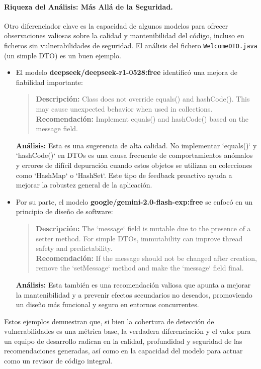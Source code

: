 \paragraph{Riqueza del Análisis: Más Allá de la Seguridad.}
Otro diferenciador clave es la capacidad de algunos modelos para ofrecer observaciones valiosas sobre la calidad y mantenibilidad del código, incluso en ficheros sin vulnerabilidades de seguridad. El análisis del fichero \texttt{WelcomeDTO.java} (un simple DTO) es un buen ejemplo.

\begin{itemize}
    \item El modelo \textbf{deepseek/deepseek-r1-0528:free} identificó una mejora de fiabilidad importante:
    \begin{quote}
        \textbf{Descripción:} Class does not override equals() and hashCode(). This may cause unexpected behavior when used in collections. \\
        \textbf{Recomendación:} Implement equals() and hashCode() based on the message field.
    \end{quote}
    \textbf{Análisis:} Esta es una sugerencia de alta calidad. No implementar `equals()` y `hashCode()` en DTOs es una causa frecuente de comportamientos anómalos y errores de difícil depuración cuando estos objetos se utilizan en colecciones como `HashMap` o `HashSet`. Este tipo de feedback proactivo ayuda a mejorar la robustez general de la aplicación.

    \item Por su parte, el modelo \textbf{google/gemini-2.0-flash-exp:free} se enfocó en un principio de diseño de software:
    \begin{quote}
        \textbf{Descripción:} The `message` field is mutable due to the presence of a setter method. For simple DTOs, immutability can improve thread safety and predictability. \\
        \textbf{Recomendación:} If the message should not be changed after creation, remove the `setMessage` method and make the `message` field final.
    \end{quote}
    \textbf{Análisis:} Esta también es una recomendación valiosa que apunta a mejorar la mantenibilidad y a prevenir efectos secundarios no deseados, promoviendo un diseño más funcional y seguro en entornos concurrentes.
\end{itemize}

Estos ejemplos demuestran que, si bien la cobertura de detección de vulnerabilidades es una métrica base, la verdadera diferenciación y el valor para un equipo de desarrollo radican en la calidad, profundidad y seguridad de las recomendaciones generadas, así como en la capacidad del modelo para actuar como un revisor de código integral.

